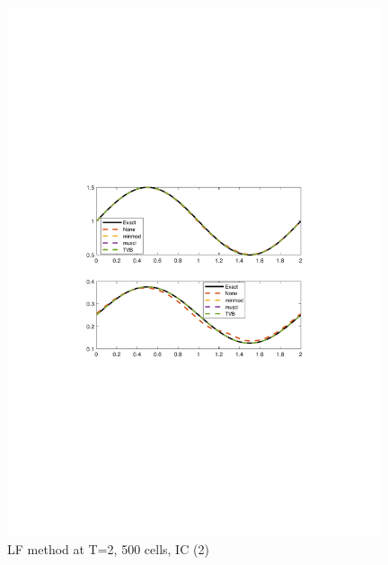 \documentclass[11pt,a4paper]{article}
\begin{document}
\begin{figure}[!htb]
    \centering
    \includegraphics[width=11cm]{2_1_b_LF.pdf}
    \caption{LF method at T=2, 500 cells, IC (2)}
    \label{fig:LF_IC_1}
\end{figure}
\end{document}
